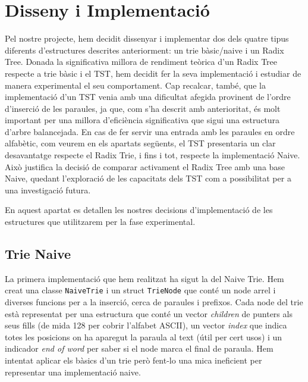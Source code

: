 \section{Disseny i Implementació}
Pel nostre projecte, hem decidit dissenyar i implementar dos dels quatre tipus diferents d'estructures descrites anteriorment: un trie bàsic/naive i un Radix Tree.
Donada la significativa millora de rendiment teòrica d'un Radix Tree respecte a trie bàsic i el TST, hem decidit fer la seva implementació i estudiar de manera experimental el seu comportament. Cap recalcar, també, 
que la implementació d'un TST venia amb una dificultat afegida provinent de l'ordre d'inserció de les paraules, ja que, com s'ha descrit amb anterioritat, és molt important per una millora d'eficiència significativa que sigui una estructura d'arbre balancejada. 
En cas de fer servir una entrada amb les paraules en ordre alfabètic, com veurem en els apartats següents, el TST presentaria un clar desavantatge respecte el Radix Trie, i fins i tot, respecte la implementació Naive. 
Això justifica la decisió de comparar activament el Radix Tree amb una base Naive, quedant l'exploració de les capacitats dels TST com a possibilitat per a una investigació futura. 

En aquest apartat es detallen les nostres decisions d'implementació de les estructures que utilitzarem per la fase experimental.

\subsection{Trie Naive}
La primera implementació que hem realitzat ha sigut la del Naive Trie. Hem creat una classe \texttt{NaiveTrie} i un struct \texttt{TrieNode} que conté un node arrel i diverses funcions per a la inserció, cerca de paraules i prefixos.
Cada node del trie està representat per una estructura que conté un vector \textit{children} de punters als seus fills (de mida 128 per cobrir l'alfabet ASCII), un vector \textit{index} que indica totes les posicions on ha aparegut la paraula al text (útil per cert usos) i un indicador \textit{end of word} per saber si el node marca el final de paraula. Hem intentat aplicar els bàsics d'un trie però fent-lo una mica ineficient per representar una implementació naive.


